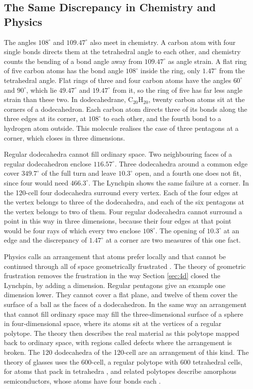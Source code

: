 \documentclass[a4paper,12pt]{article}
\begin{document}
\subsection{The Same Discrepancy in Chemistry and Physics}
The angles \( 108^\circ \) and \( 109.47^\circ \) also meet in chemistry. A carbon atom with four single bonds directs them at the tetrahedral angle to each other, and chemistry counts the bending of a bond angle away from \( 109.47^\circ \) as angle strain. A flat ring of five carbon atoms has the bond angle \( 108^\circ \) inside the ring, only \( 1.47^\circ \) from the tetrahedral angle. Flat rings of three and four carbon atoms have the angles \( 60^\circ \) and \( 90^\circ \), which lie \( 49.47^\circ \) and \( 19.47^\circ \) from it, so the ring of five has far less angle strain than these two. In dodecahedrane, \( \mathrm{C_{20}H_{20}} \), twenty carbon atoms sit at the corners of a dodecahedron. Each carbon atom directs three of its bonds along the three edges at its corner, at \( 108^\circ \) to each other, and the fourth bond to a hydrogen atom outside. This molecule realises the case of three pentagons at a corner, which closes in three dimensions.

Regular dodecahedra cannot fill ordinary space. Two neighbouring faces of a regular dodecahedron enclose \( 116.57^\circ \). Three dodecahedra around a common edge cover \( 349.7^\circ \) of the full turn and leave \( 10.3^\circ \) open, and a fourth one does not fit, since four would need \( 466.3^\circ \). The Lynchpin shows the same failure at a corner. In the 120-cell four dodecahedra surround every vertex. Each of the four edges at the vertex belongs to three of the dodecahedra, and each of the six pentagons at the vertex belongs to two of them. Four regular dodecahedra cannot surround a point in this way in three dimensions, because their four edges at that point would be four rays of which every two enclose \( 108^\circ \). The opening of \( 10.3^\circ \) at an edge and the discrepancy of \( 1.47^\circ \) at a corner are two measures of this one fact.

Physics calls an arrangement that atoms prefer locally and that cannot be continued through all of space geometrically frustrated \cite{sadoc-mosseri}. The theory of geometric frustration removes the frustration in the way Section \ref{sec:4d} closed the Lynchpin, by adding a dimension. Regular pentagons give an example one dimension lower. They cannot cover a flat plane, and twelve of them cover the surface of a ball as the faces of a dodecahedron. In the same way an arrangement that cannot fill ordinary space may fill the three-dimensional surface of a sphere in four-dimensional space, where its atoms sit at the vertices of a regular polytope. The theory then describes the real material as this polytope mapped back to ordinary space, with regions called defects where the arrangement is broken. The 120 dodecahedra of the 120-cell are an arrangement of this kind. The theory of glasses uses the 600-cell, a regular polytope with 600 tetrahedral cells, for atoms that pack in tetrahedra \cite{sadoc-mosseri, tarjus}, and related polytopes describe amorphous semiconductors, whose atoms have four bonds each \cite{mosseri1985}.
\end{document}
